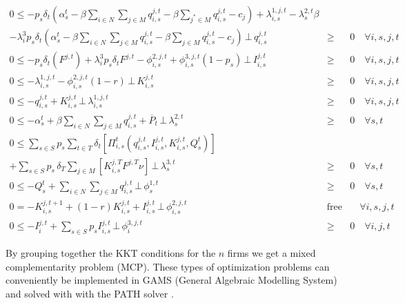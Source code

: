 \begin{align}
0\leq - p_s\delta_t\left(\alpha_s^t-\beta \sum_{i\in N}\sum_{j\in M} q_{i,s}^{j,t}-\beta\sum_{j^*\in M}q_{i,s}^{j,t}-c_j\right)+\lambda_{i,s}^{1,j,t} - \lambda_{s}^{2,t}\beta\nonumber\\ -\lambda_i^3p_s\delta_t\left(\alpha_s^t-\beta \sum_{i\in N}\sum_{j\in M} q_{i,s}^{j,t}-\beta\sum_{j\in M}q_{i,s}^{j,t}-c_j\right) \,\bot\, q_{i,s}^{j,t}&\geq& 0  \quad \forall i,s,j,t\\
0\leq - p_s\delta_t\left(F^{j,t}\right)+\lambda_i^3p_s\delta_tF^{j,t}- \phi_{i,s}^{2,j,t}+\phi_{i,s}^{3,j,t}\left(1-p_s\right)\,\bot\, I_{i,s}^{j,t}&\geq& 0  \quad \forall i,s,j,t\\
0 \leq -\lambda_{i,s}^{1,j,t}  -\phi_{i,s}^{2,j,t}(1-r) \,\bot\, K_{i,s}^{j,t}&\geq& 0  \quad \forall i,s,j,t\\
0\leq -q_{i,s}^{j,t} + K_{i,s}^{j,t} \,\bot\, \lambda_{i,s}^{1,j,t} &\geq& 0  \quad \forall i,s,j,t\\
0\leq -\alpha_s^t+\beta\sum_{i\in N}\sum_{j\in M}q_{i,s}^{j,t} + \overline{P}_t \,\bot\, \lambda_{s}^{2,t}&\geq& 0  \quad \forall s,t\\
0\leq  \sum_{s\in S}p_s \sum_{t\in T}\delta_t\left[\Pi_{i,s}^t\left(q_{i,s}^{j,t}, I_{i,s}^{j,t}, K_{i,s}^{j,t}, Q_s^t\right) \right ]\\
+ \sum_{s\in S}p_s\,\delta_T \sum_{j\in M}\left[K_{i,s}^{j,T}F^{j,T}\nu\right] \,\bot\, \lambda_{s}^{3,t}&\geq& 0  \quad \forall s,t\\
0 \leq -Q_s^t+\sum_{i\in N}\sum_{j\in M} q_{i,s}^{j,t} \,\bot\, \phi_{s}^{1,t}&\geq& 0  \quad \forall s,t\\
0 = -K_{i,s}^{j,t+1} + (1-r)K_{i,s}^{j,t}+I_{i,s}^{j,t} \,\bot\, \phi_{i,s}^{2,j,t}&\mbox{free}&   \quad \forall i,s,j,t\\
0 \leq -I_{i}^{j,t}+\sum_{s\in S}p_sI_{i,s}^{j,t} \,\bot\, \phi_{i}^{3,j,t}&\geq& 0  \quad \forall i,j,t
\end{align}








By grouping together the KKT conditions for the $n$ firms we get a mixed complementarity problem (MCP). These types of optimization problems can conveniently be implemented in GAMS (General Algebraic Modelling System) and solved with with the PATH solver \citep[see][]{Ferris2000}.

